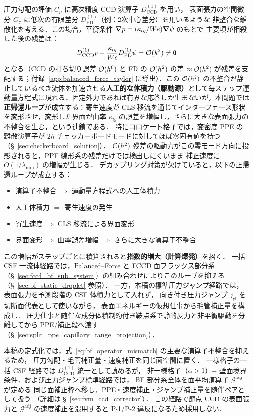 圧力勾配の評価 $G_p$ に高次精度 CCD 演算子 $D^{(1)}_{\mathrm{CCD}}$ を用い，
表面張力の空間微分 $G_\sigma$ に低次の有限差分 $D^{(1)}_{\mathrm{FD}}$（例：2次中心差分）を用いるような
非整合な離散化を考える．この場合，平衡条件 $\bm{\nabla} p = (\kappa_{lg}/We)\bm{\nabla}\psi$ のもとで
主要項が相殺した後の残差は：
\begin{equation}
  D^{(1)}_{\mathrm{CCD}} p - \frac{\kappa_{lg}}{We} D^{(1)}_{\mathrm{FD}}\psi
  = \mathcal{O}(h^2) \neq \bm{0}
  \label{eq:bf_operator_mismatch}
\end{equation}
となる（CCD の打ち切り誤差 $\mathcal{O}(h^6)$ と FD の $\mathcal{O}(h^2)$ の差 $\approx \mathcal{O}(h^2)$ が残差を支配する；付録~\ref{app:balanced_force_taylor} に導出）．この $\mathcal{O}(h^2)$ の不整合が静止しているべき流体を加速させる\textbf{人工的な体積力（駆動源）}として毎ステップ運動量方程式に現れる．固定外力であれば有界な応答しか生まないが，本問題では\textbf{正帰還ループ}が成立する：寄生速度が CLS 移流を通じてインターフェース形状を変形させ，変形した界面が曲率 $\kappa_{lg}$ の誤差を増幅し，さらに大きな表面張力の不整合を生む，という連鎖である．
特にコロケート格子では，変密度 PPE の離散演算子が $2h$ チェッカーボードモードに対してほぼ零固有値を持つ（§~\ref{sec:checkerboard_solution}）．
$\mathcal{O}(h^2)$ 残差の駆動力がこの零モード方向に投影されると，PPE 線形系の残差だけでは検出しにくいまま
補正速度に $O(1/\lambda_{\min})$ の増幅が生じる．
デカップリング対策が欠けていると，以下の正帰還ループが成立する：
\begin{itemize}
  \item 演算子不整合 $\Rightarrow$ 運動量方程式への人工体積力
  \item 人工体積力 $\Rightarrow$ 寄生速度の発生
  \item 寄生速度 $\Rightarrow$ CLS 移流による界面変形
  \item 界面変形 $\Rightarrow$ 曲率誤差増幅 $\Rightarrow$ さらに大きな演算子不整合
\end{itemize}
この増幅がステップごとに積算されると\textbf{指数的増大（計算爆発）}を招く．
一括 CSF 一流体経路では，Balanced--Force と FCCD 面フラックス部分系
（§~\ref{sec:fccd_bf_sub_system}）の組み合わせによりこのループを抑える
（§~\ref{sec:bf_static_droplet} 参照）．
一方，本稿の標準圧力ジャンプ経路では，表面張力を予測段階の CSF 体積力として入れず，
向き付き圧力ジャンプ $j_{gl}$ を切断面代表として使いながら，
表面エネルギーの仮想仕事から毛管補正量を構成し，
圧力仕事と随伴な成分体積制約付き鞍点系で静的反力と非平衡駆動を分離してから
PPE/補正段へ渡す（§~\ref{sec:split_ppe_capillary_range_projection}）．

本稿の定式化では，式~\eqref{eq:bf_operator_mismatch} の主要な演算子不整合を抑えるため，
圧力勾配・毛管補正量・速度補正を同じ面空間に置く．
一様格子の一括 CSF 経路では $D^{(1)}_\mathrm{CCD}$ 統一として読めるが，
非一様格子（$\alpha>1$）+ 壁面境界条件，および圧力ジャンプ標準経路では，
BF 部分系全体を面平均演算子 $\mathcal{G}^\text{adj}$ が定める
同じ面補正枠へ移し，PPE・速度補正・ジャンプ補正量を随伴ペアとして扱う
（詳細は §~\ref{sec:fvm_ccd_corrector}）．
この経路で節点 CCD の表面張力と $\mathcal{G}^\text{adj}$ の速度補正を混用すると
P-1/P-2 違反になるため採用しない．

